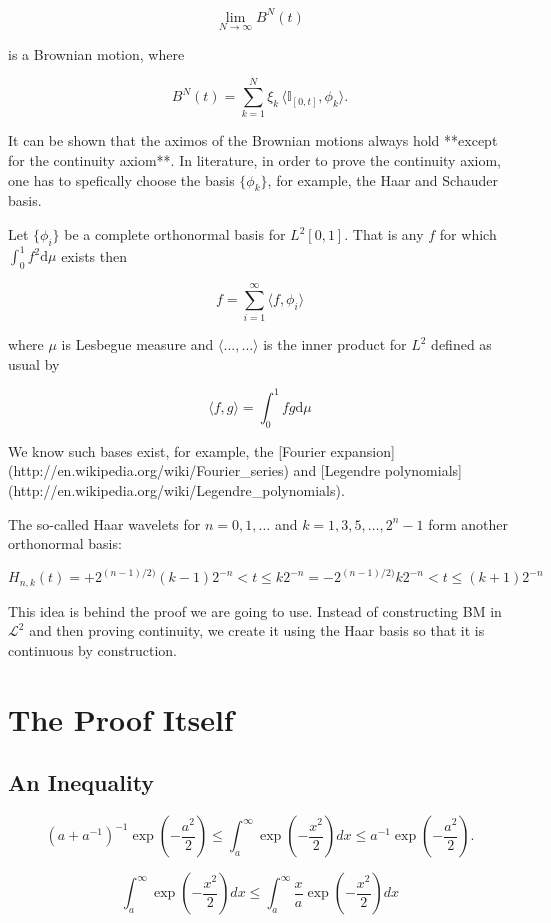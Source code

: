 \documentclass{article}
\begin{document}
$$
\lim_{N\to \infty} B^N(t)
$$

is a Brownian motion, where

$$
B^N(t) = \sum^N_{k=1} \xi_k \, \langle \mathbb{I}_{[0,t]}, \phi_k \rangle.
$$

It can be shown that the aximos of the Brownian motions always hold
**except for the continuity axiom**. In literature, in order to prove
the continuity axiom, one has to spefically choose the basis
$\{\phi_k\}$, for example, the Haar and Schauder basis.


Let $\{\phi_i\}$ be a complete orthonormal basis for $L^2[0,1]$. That
is any $f$ for which $\int_0^1 f^2 \mathrm{d}\mu$ exists then

$$
f = \sum_{i=1}^\infty \langle f, \phi_i\rangle
$$

where $\mu$ is Lesbegue measure and $\langle\ldots,\ldots\rangle$ is
the inner product for $L^2$ defined as usual by

$$
\langle f, g\rangle = \int_0^1 fg\mathrm{d}\mu
$$

We know such bases exist, for example, the [Fourier
expansion](http://en.wikipedia.org/wiki/Fourier_series) and [Legendre
polynomials](http://en.wikipedia.org/wiki/Legendre_polynomials).


The so-called Haar wavelets for $n = 0, 1, \ldots$ and $k = 1, 3, 5, \ldots, 2^n - 1$ form another orthonormal basis:

$$
H_{n,k}(t) = +2^{(n-1)/2)} (k - 1)2^{-n} < t \le k2^{-n}
           = -2^{(n-1)/2)} k2^{-n}       < t \le (k + 1)2^{-n}
$$

This idea is behind the proof we are going to use. Instead of
constructing BM in ${\mathcal{L}}^2$ and then proving continuity, we
create it using the Haar basis so that it is continuous by
construction.

\section{The Proof Itself}

\subsection{An Inequality}

$$
\left(a+a^{-1}\right)^{-1} \exp \left(-\frac{a^2}{2}\right) \leq \int_a^{\infty} \exp \left(-\frac{x^2}{2}\right) d x \leq a^{-1} \exp \left(-\frac{a^2}{2}\right) .
$$

$$
\int_a^{\infty} \exp \left(-\frac{x^2}{2}\right) d x \leq \int_a^{\infty} \frac{x}{a} \exp \left(-\frac{x^2}{2}\right) d x
$$
\end{document}
